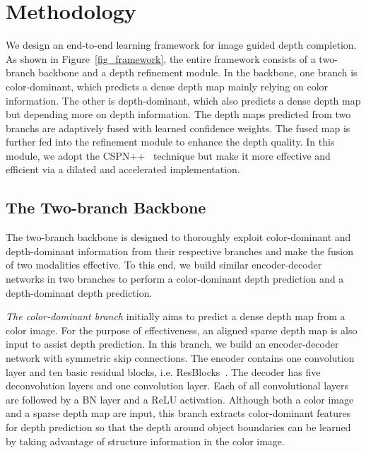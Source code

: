 \documentclass[letterpaper, 10 pt, conference]{ieeeconf}
\begin{document}
  




\section{Methodology}
We design an end-to-end learning framework for image guided depth completion. As shown in Figure~\ref{fig_framework}, the entire framework consists of a two-branch backbone and a depth refinement module. In the backbone, one branch is color-dominant, which predicts a dense depth map mainly relying on color information. The other is depth-dominant, which also predicts a dense depth map but depending more on depth information. The depth maps predicted from two branchs are adaptively fused with learned confidence weights. The fused map is further fed into the refinement module to enhance the depth quality. In this module, we adopt the CSPN++~\cite{Cheng2020CSPN++} technique but make it more effective and efficient via a dilated and accelerated implementation. 









\subsection{The Two-branch Backbone}
The two-branch backbone is designed to thoroughly exploit color-dominant and depth-dominant information from their respective branches and make the fusion of two modalities effective. To this end, we build similar encoder-decoder networks in two branches to perform a color-dominant depth prediction and a depth-dominant depth prediction. 










\textit{The color-dominant branch} initially aims to predict a dense depth map from a color image. For the purpose of effectiveness, an aligned sparse depth map is also input to assist depth prediction. In this branch, we build an encoder-decoder network with symmetric skip connections. The encoder contains one convolution layer and ten basic residual blocks, i.e. ResBlocks~\cite{he2016deep}. The decoder has five deconvolution layers and one convolution layer. Each of all convolutional layers are followed by a BN layer and a ReLU activation. Although both a color image and a sparse depth map are input, this branch extracts color-dominant features for depth prediction so that the depth around object boundaries can be learned by taking advantage of structure information in the color image. 
\end{document}
